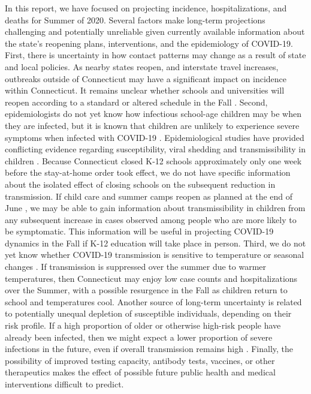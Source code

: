 \documentclass[11pt]{article}
\begin{document}
In this report, we have focused on projecting incidence, hospitalizations, and deaths for Summer of 2020. Several factors make long-term projections challenging and potentially unreliable given currently available information about the state's reopening plans, interventions, and the epidemiology of COVID-19.  First, there is uncertainty in how contact patterns may change as a result of state and local policies.  As nearby states reopen, and interstate travel increases, outbreaks outside of Connecticut may have a significant impact on incidence within Connecticut. It remains unclear whether schools and universities will reopen according to a standard or altered schedule in the Fall \citep{viner2020school, mangrum2020college}. Second, epidemiologists do not yet know how infectious school-age children may be when they are infected, but it is known that children are unlikely to experience severe symptoms when infected with COVID-19 \citep{verity2020estimates,ludvigsson2020systematic, gudbjartsson2020spread, dong2020epidemiology, dingens2020seroprevalence}.  Epidemiological studies have provided conflicting evidence regarding susceptibility, viral shedding and transmissibility in children \citep{lee2020children,viner2020school,jones2020analysis, didomenico2020expected}.  Because Connecticut closed K-12 schools approximately only one week before the stay-at-home order took effect, we do not have specific information about the isolated effect of closing schools on the subsequent reduction in transmission.  If child care and summer camps reopen as planned at the end of June \citep{dunne2020state}, we may be able to gain information about transmissibility in children from any subsequent increase in cases observed among people who are more likely to be symptomatic.  This information will be useful in projecting COVID-19 dynamics in the Fall if K-12 education will take place in person.  Third, we do not yet know whether COVID-19 transmission is sensitive to temperature or seasonal changes \citep{kissler2020projecting,xu2020modest}. If transmission is suppressed over the summer due to warmer temperatures, then Connecticut may enjoy low case counts and hospitalizations over the Summer, with a possible resurgence in the Fall as children return to school and temperatures cool. Another source of long-term uncertainty is related to potentially unequal depletion of susceptible individuals, depending on their risk profile.  If a high proportion of older or otherwise high-risk people have already been infected, then we might expect a lower proportion of severe infections in the future, even if overall transmission remains high \citep{gomes2020individual, britton2020disease}. Finally, the possibility of improved testing capacity, antibody tests, vaccines, or other therapeutics makes the effect of possible future public health and medical interventions difficult to predict.  
\end{document}
